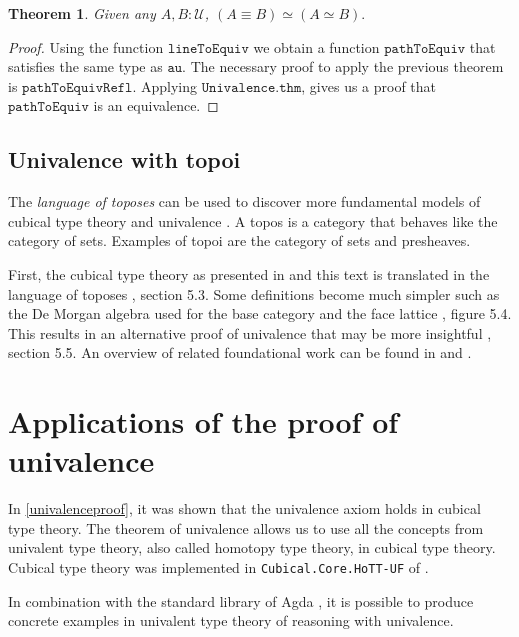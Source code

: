 \documentclass[11pt,a4paper,twoside,xetex,draft]{book}
\newcommand{\keyword}[1]{\emph{#1}\index{#1}}
\newtheorem{theorem}{Theorem}[section]
\newcommand{\op}[1]{\mathtt{#1}}
\begin{document}
\begin{theorem}
Given any $A,B : \mathcal{U}$, $\left( A \equiv B \right) \simeq \left( A \simeq B \right).$
\end{theorem}


\begin{proof}
Using the function $\op{lineToEquiv}$ we obtain a function $\op{pathToEquiv}$ that satisfies the same type as $\op{au}$. The necessary proof to apply the previous theorem is $\op{pathToEquivRefl}$. Applying $\op{Univalence.thm}$, gives us a proof that $\op{pathToEquiv}$ is an equivalence.
\end{proof}

\subsection{Univalence with topoi}

The \keyword{language of toposes} can be used to discover more fundamental models of cubical type theory and univalence \cite{Orton2019}. A topos is a category that behaves like the category of sets. Examples of topoi are the category of sets and presheaves. 

First, the cubical type theory as presented in \cite{Huber2016} and this text is translated in the  language of toposes \cite{Orton2019}, section 5.3. Some definitions become much simpler such as the De Morgan algebra used for the base category and the face lattice \cite{Orton2019}, figure 5.4. This results in an alternative proof of univalence that may be more insightful \cite{Orton2019}, section 5.5. An overview of related foundational work can be found in \cite{Pitts2018} and \cite{Licata2018}.


\section{Applications of the proof of univalence} \label{applications}

In \cref{univalenceproof}, it was shown that the univalence axiom holds in cubical type theory. The theorem of univalence allows us to use all the concepts from univalent type theory, also called homotopy type theory, in cubical type theory. Cubical type theory was implemented in \texttt{Cubical.Core.HoTT-UF} of \cite{Moertberg2018}.

In combination with the standard library of Agda \cite{Danielsson2019}, it is possible to produce concrete examples in univalent type theory of reasoning with univalence.
\end{document}
